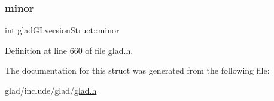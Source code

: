 \subsubsection{\texorpdfstring{minor}{minor}}
{\footnotesize\ttfamily int glad\+G\+Lversion\+Struct\+::minor}



Definition at line 660 of file glad.\+h.



The documentation for this struct was generated from the following file\+:\begin{DoxyCompactItemize}
\item 
glad/include/glad/\mbox{\hyperlink{glad_8h}{glad.\+h}}\end{DoxyCompactItemize}
